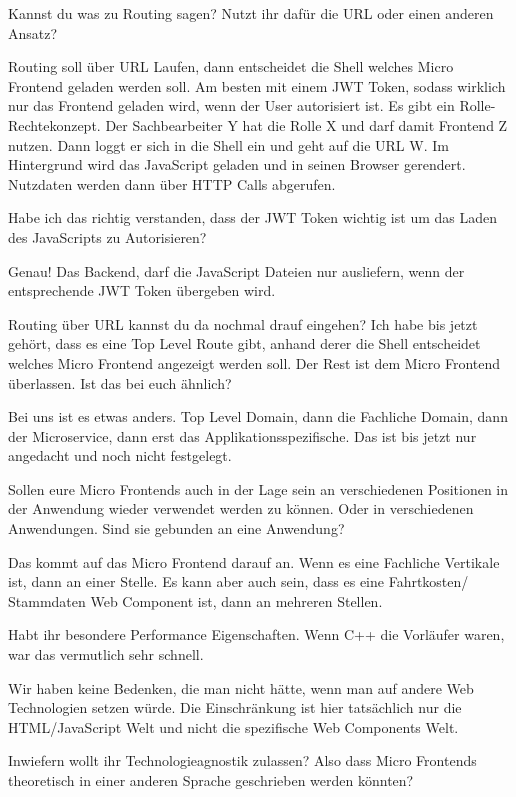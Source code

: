 \begin{description}
    \NicoVogel Kannst du was zu Routing sagen? Nutzt ihr dafür die URL oder einen anderen Ansatz?

    \PhilippHuber Routing soll über URL Laufen, dann entscheidet die Shell welches Micro Frontend geladen werden soll. Am besten mit einem JWT Token, sodass wirklich nur das Frontend geladen wird, wenn der User autorisiert ist. Es gibt ein Rolle-Rechtekonzept. Der Sachbearbeiter Y hat die Rolle X und darf damit Frontend Z nutzen. Dann loggt er sich in die Shell ein und geht auf die URL W. Im Hintergrund wird das JavaScript geladen und in seinen Browser gerendert. Nutzdaten werden dann über HTTP Calls abgerufen.

    \NicoVogel Habe ich das richtig verstanden, dass der JWT Token wichtig ist um das Laden des JavaScripts zu Autorisieren?

    \PhilippHuber Genau! Das Backend, darf die JavaScript Dateien nur ausliefern, wenn der entsprechende JWT Token übergeben wird.

    \NicoVogel Routing über URL kannst du da nochmal drauf eingehen? Ich habe bis jetzt gehört, dass es eine Top Level Route gibt, anhand derer die Shell entscheidet welches Micro Frontend angezeigt werden soll. Der Rest ist dem Micro Frontend überlassen. Ist das bei euch ähnlich?

    \PhilippHuber Bei uns ist es etwas anders. Top Level Domain, dann die Fachliche Domain, dann der Microservice, dann erst das Applikationsspezifische. Das ist bis jetzt nur angedacht und noch nicht festgelegt.

    \NicoVogel Sollen eure Micro Frontends auch in der Lage sein an verschiedenen Positionen in der Anwendung wieder verwendet werden zu können. Oder in verschiedenen Anwendungen. Sind sie gebunden an eine Anwendung?

    \PhilippHuber Das kommt auf das Micro Frontend darauf an. Wenn es eine Fachliche Vertikale ist, dann an einer Stelle. Es kann aber auch sein, dass es eine Fahrtkosten/ Stammdaten Web Component ist, dann an mehreren Stellen.

    \NicoVogel Habt ihr besondere Performance Eigenschaften. Wenn C++ die Vorläufer waren, war das vermutlich sehr schnell.

    \PhilippHuber Wir haben keine Bedenken, die man nicht hätte, wenn man auf andere Web Technologien setzen würde. Die Einschränkung ist hier tatsächlich nur die HTML/JavaScript Welt und nicht die spezifische Web Components Welt.

    \NicoVogel Inwiefern wollt ihr Technologieagnostik zulassen? Also dass Micro Frontends theoretisch in einer anderen Sprache geschrieben werden könnten?


\end{description}
